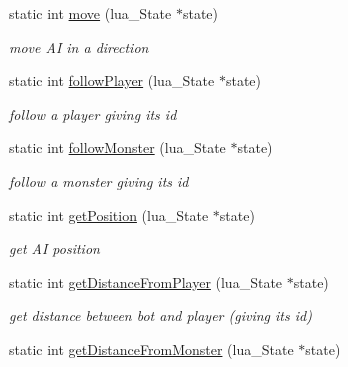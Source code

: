 \begin{DoxyCompactItemize}
\mbox{\label{classIA_a23d578bd33cd4260b9381116d5979c2e}} 
static int \hyperlink{classIA_a23d578bd33cd4260b9381116d5979c2e}{move} (lua\+\_\+\+State $\ast$state)
\begin{DoxyCompactList}\small\item\em move AI in a direction \end{DoxyCompactList}\item 
\mbox{\label{classIA_a7b69140525af0e287742977cd803927f}} 
static int \hyperlink{classIA_a7b69140525af0e287742977cd803927f}{follow\+Player} (lua\+\_\+\+State $\ast$state)
\begin{DoxyCompactList}\small\item\em follow a player giving its id \end{DoxyCompactList}\item 
\mbox{\label{classIA_ab01d8d14b0e5fdb8f66c23f001370cfa}} 
static int \hyperlink{classIA_ab01d8d14b0e5fdb8f66c23f001370cfa}{follow\+Monster} (lua\+\_\+\+State $\ast$state)
\begin{DoxyCompactList}\small\item\em follow a monster giving its id \end{DoxyCompactList}\item 
\mbox{\label{classIA_a528b38ddf9f67ec6d226969360adab46}} 
static int \hyperlink{classIA_a528b38ddf9f67ec6d226969360adab46}{get\+Position} (lua\+\_\+\+State $\ast$state)
\begin{DoxyCompactList}\small\item\em get AI position \end{DoxyCompactList}\item 
\mbox{\label{classIA_aeedb20926ec98fd6f9d3686399640793}} 
static int \hyperlink{classIA_aeedb20926ec98fd6f9d3686399640793}{get\+Distance\+From\+Player} (lua\+\_\+\+State $\ast$state)
\begin{DoxyCompactList}\small\item\em get distance between bot and player (giving its id) \end{DoxyCompactList}\item 
\mbox{\label{classIA_aec6be85641e599edb2482686d99e5d57}} 
static int \hyperlink{classIA_aec6be85641e599edb2482686d99e5d57}{get\+Distance\+From\+Monster} (lua\+\_\+\+State $\ast$state)

\end{DoxyCompactItemize}
